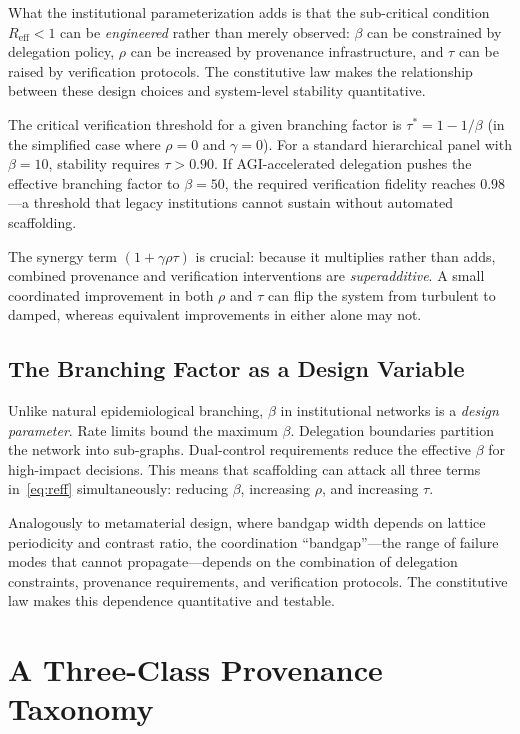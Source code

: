 \documentclass[runningheads]{llncs}
\begin{document}
What the institutional parameterization adds is that the sub-critical condition $R_{\mathrm{eff}} < 1$ can be \emph{engineered} rather than merely observed: $\beta$ can be constrained by delegation policy, $\rho$ can be increased by provenance infrastructure, and $\tau$ can be raised by verification protocols. The constitutive law makes the relationship between these design choices and system-level stability quantitative.

The critical verification threshold for a given branching factor is $\tau^* = 1 - 1/\beta$ (in the simplified case where $\rho = 0$ and $\gamma = 0$). For a standard hierarchical panel with $\beta = 10$, stability requires $\tau > 0.90$. If AGI-accelerated delegation pushes the effective branching factor to $\beta = 50$, the required verification fidelity reaches $0.98$---a threshold that legacy institutions cannot sustain without automated scaffolding.

The synergy term $(1 + \gamma \rho \tau)$ is crucial: because it multiplies rather than adds, combined provenance and verification interventions are \emph{superadditive}. A small coordinated improvement in both $\rho$ and $\tau$ can flip the system from turbulent to damped, whereas equivalent improvements in either alone may not.

\subsection{The Branching Factor as a Design Variable}

Unlike natural epidemiological branching, $\beta$ in institutional networks is a \emph{design parameter}. Rate limits bound the maximum $\beta$. Delegation boundaries partition the network into sub-graphs. Dual-control requirements reduce the effective $\beta$ for high-impact decisions. This means that scaffolding can attack all three terms in~\eqref{eq:reff} simultaneously: reducing $\beta$, increasing $\rho$, and increasing $\tau$.

Analogously to metamaterial design, where bandgap width depends on lattice periodicity and contrast ratio, the coordination ``bandgap''---the range of failure modes that cannot propagate---depends on the combination of delegation constraints, provenance requirements, and verification protocols. The constitutive law makes this dependence quantitative and testable.


\section{A Three-Class Provenance Taxonomy}
\label{sec:provenance}
\end{document}

